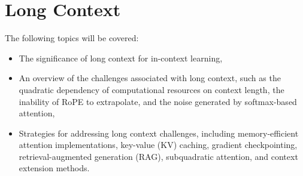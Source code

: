 \chapter{Long Context}

The following topics will be covered:
\begin{itemize}
    \item The significance of long context for in-context learning,
    \item An overview of the challenges associated with long context, such as the quadratic dependency of computational resources on context length, the inability of RoPE to extrapolate, and the noise generated by softmax-based attention,
    \item Strategies for addressing long context challenges, including memory-efficient attention implementations, key-value (KV) caching, gradient checkpointing, retrieval-augmented generation (RAG), subquadratic attention, and context extension methods.
\end{itemize}
